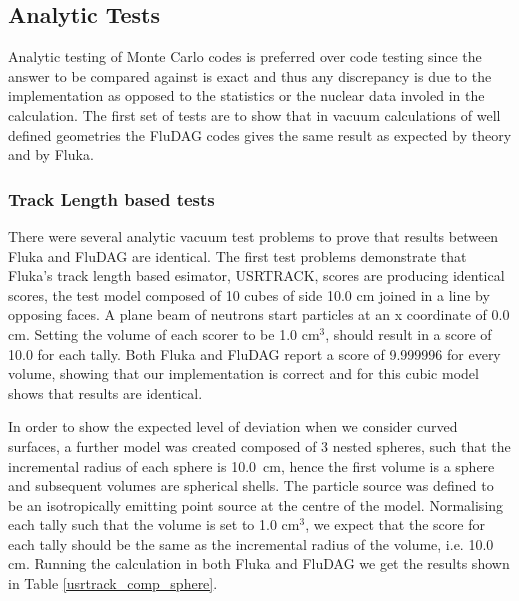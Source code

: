 \documentclass{anstrans}[12pt]
\begin{document}
\subsection{Analytic Tests}
Analytic testing of Monte Carlo codes is preferred over code testing since the
answer to be compared against is exact and thus any discrepancy is due
to the implementation as opposed to the statistics or the nuclear data
involed in the calculation. The first set of tests are to show that in
vacuum calculations of well defined geometries the FluDAG codes gives
the same result as expected by theory and by Fluka.

\subsubsection*{Track Length based tests}
There were several analytic vacuum test problems to prove that results
between Fluka and FluDAG are identical. The first test problems
demonstrate that Fluka's track length based esimator, USRTRACK, 
scores are producing identical scores, the test model composed of 
10 cubes of side 10.0 cm joined in a line by opposing faces. A plane 
beam of neutrons start particles at an x coordinate of 0.0 cm. Setting 
the volume of each scorer to be 1.0 cm$^3$, should result in a score of 
10.0 for each tally. Both Fluka and FluDAG report a score of 9.999996 for every volume,
showing that our implementation is correct and for this cubic model
shows that results are identical.


In order to show the expected level of deviation when we consider
curved surfaces, a further model was created composed of 3 nested
spheres, such that the incremental radius of each sphere is 10.0\ cm,
hence the first volume is a sphere and subsequent volumes are
spherical shells. The particle source was defined to be an
isotropically emitting point source at the centre of the
model. Normalising each tally such that the volume is set to 1.0 cm$^3$, 
we expect that the score for each tally should be the same as the
incremental radius of the volume, i.e. 10.0 cm. Running the calculation
in both Fluka and FluDAG we get the results shown in Table \ref{usrtrack_comp_sphere}.
\end{document}
